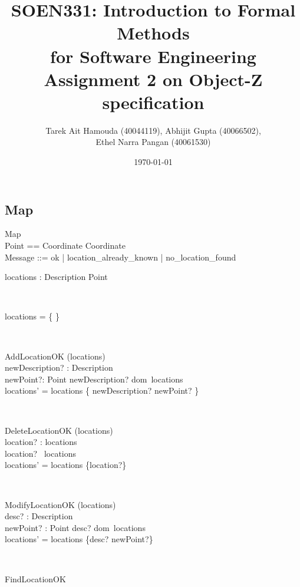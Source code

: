 \documentclass[12pt]{article}
\title{SOEN331: Introduction to Formal Methods\\for Software Engineering\\
Assignment 2 on Object-Z specification}
\author{Tarek Ait Hamouda (40044119), Abhijit Gupta (40066502),\\ 
Ethel Narra Pangan (40061530)}
\date{\today}
\begin{document}
\begin{spacing}{1.5}

\maketitle

\newpage

\section{Map}

\begin{class}{Map}
 \\
Point == Coordinate \times Coordinate \\
Message ::= ok | location\_already\_known | no\_location\_found \\
\begin{state}
locations : Description \pfun Point\\
\end{state} \\
\begin{init}
locations = \{ \}
\end{init} \\
\begin{op}{AddLocationOK}
\Delta (locations) \\
newDescription? : Description\\
newPoint?: Point 
\ST
newDescription? \notin dom~locations \\
locations' = locations \cup \{ newDescription? \to newPoint? \}
\end{op}\\
\begin{op}{DeleteLocationOK}
\Delta (locations) \\
location? : locations\\
\ST
location? \in ~locations\\
locations' = locations \setminus \{location?\}
\end{op}\\
\begin{op}{ModifyLocationOK}
\Delta (locations) \\
desc? : Description\\
newPoint? : Point
\ST
desc? \in dom~locations \\
locations' = locations \oplus \{desc? \to newPoint?\}
\end{op}\\ 
\begin{op}{FindLocationOK}

\end{op}
\end{class}
\end{spacing}
\end{document}
